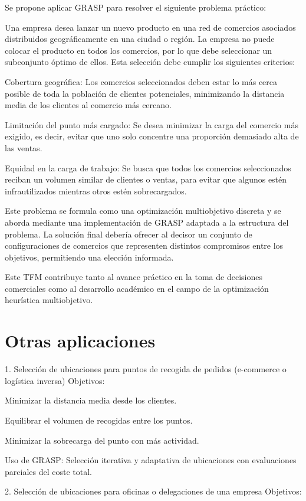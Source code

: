 \documentclass[12pt,a4paper]{book}
\begin{document}
Se propone aplicar GRASP para resolver el siguiente problema práctico:

Una empresa desea lanzar un nuevo producto en una red de comercios asociados distribuidos geográficamente en una ciudad o región. La empresa no puede colocar el producto en todos los comercios, por lo que debe seleccionar un subconjunto óptimo de ellos. Esta selección debe cumplir los siguientes criterios:

Cobertura geográfica: Los comercios seleccionados deben estar lo más cerca posible de toda la población de clientes potenciales, minimizando la distancia media de los clientes al comercio más cercano.

Limitación del punto más cargado: Se desea minimizar la carga del comercio más exigido, es decir, evitar que uno solo concentre una proporción demasiado alta de las ventas.

Equidad en la carga de trabajo: Se busca que todos los comercios seleccionados reciban un volumen similar de clientes o ventas, para evitar que algunos estén infrautilizados mientras otros estén sobrecargados.

Este problema se formula como una optimización multiobjetivo discreta y se aborda mediante una implementación de GRASP adaptada a la estructura del problema. La solución final debería ofrecer al decisor un conjunto de configuraciones de comercios que representen distintos compromisos entre los objetivos, permitiendo una elección informada.

Este TFM contribuye tanto al avance práctico en la toma de decisiones comerciales como al desarrollo académico en el campo de la optimización heurística multiobjetivo.


\section{Otras aplicaciones}

1. Selección de ubicaciones para puntos de recogida de pedidos (e-commerce o logística inversa)
Objetivos:

Minimizar la distancia media desde los clientes.

Equilibrar el volumen de recogidas entre los puntos.

Minimizar la sobrecarga del punto con más actividad.

Uso de GRASP: Selección iterativa y adaptativa de ubicaciones con evaluaciones parciales del coste total.

2. Selección de ubicaciones para oficinas o delegaciones de una empresa
Objetivos:
\end{document}
